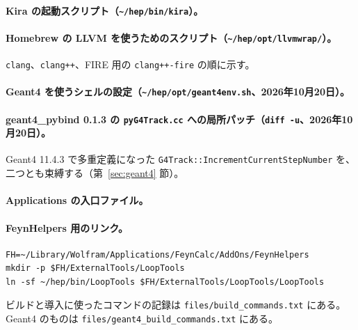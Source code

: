 \documentclass[a4paper,10pt]{ltjsarticle}
\begin{document}
\paragraph{Kira の起動スクリプト（\texttt{\textasciitilde/hep/bin/kira}）。}

\paragraph{Homebrew の LLVM を使うためのスクリプト（\texttt{\textasciitilde/hep/opt/llvmwrap/}）。}\texttt{clang}、\texttt{clang++}、FIRE 用の \texttt{clang++-fire} の順に示す。

\paragraph{Geant4 を使うシェルの設定（\texttt{\textasciitilde/hep/opt/geant4env.sh}、2026年10月20日）。}

\paragraph{geant4\_pybind 0.1.3 の \texttt{pyG4Track.cc} への局所パッチ（\texttt{diff -u}、2026年10月20日）。}Geant4 11.4.3 で多重定義になった \texttt{G4Track::IncrementCurrentStepNumber} を、二つとも束縛する（第~\ref{sec:geant4} 節）。

\paragraph{Applications の入口ファイル。}

\paragraph{FeynHelpers 用のリンク。}
\begin{Verbatim}
FH=~/Library/Wolfram/Applications/FeynCalc/AddOns/FeynHelpers
mkdir -p $FH/ExternalTools/LoopTools
ln -sf ~/hep/bin/LoopTools $FH/ExternalTools/LoopTools/LoopTools
\end{Verbatim}

ビルドと導入に使ったコマンドの記録は \nolinkurl{files/build_commands.txt} にある。Geant4 のものは \nolinkurl{files/geant4_build_commands.txt} にある。
\end{document}
